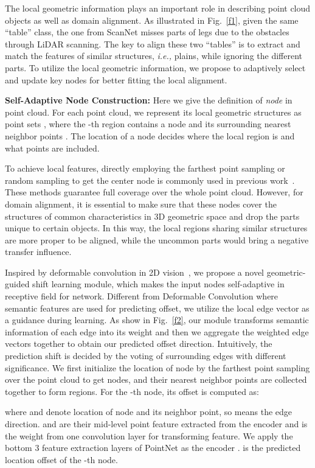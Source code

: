 \documentclass{article}
\begin{document}
The local geometric information plays an important role in describing point cloud objects as well as domain alignment. As illustrated in Fig.~\ref{f1}, given the same “table” class, the one from ScanNet misses parts of legs due to the obstacles through LiDAR scanning. The key to align these two “tables” is to extract and match the features of similar structures, \textit{i.e.,} plains, while ignoring the different parts. To utilize the local geometric information, we propose to adaptively select and update key nodes for better fitting the local alignment.

\textbf{Self-Adaptive Node Construction:} Here we give the definition of \textit{node} in point cloud. For each point cloud, we represent its  local geometric structures as  point sets , where the -th region  contains a node  and its surrounding  nearest neighbor points . The location of a node decides where the local region is and what points are included.

To achieve local features, directly employing the farthest point sampling or random sampling to get the center node is commonly used in previous work~\cite{qi2017pointnet++,li2018pointcnn}. These methods guarantee full coverage over the whole point cloud. However, for domain alignment, it is essential to make sure that these nodes cover the structures of common characteristics in 3D geometric space and drop the parts unique to certain objects. In this way, the local regions sharing similar structures are more proper to be aligned, while the uncommon parts would bring a negative transfer influence.

Inspired by deformable convolution in 2D vision~\cite{dai2017deformable}, we propose a novel geometric-guided shift learning module, which makes the input nodes self-adaptive in receptive field for network. Different from Deformable Convolution where semantic features are used for predicting offset, we utilize the local edge vector as a guidance during learning. As show in Fig.~\ref{f2}, our module transforms semantic information of each edge into its weight and then we aggregate the weighted edge vectors together to obtain our predicted offset direction. Intuitively, the prediction shift is decided by the voting of surrounding edges with different significance. We first initialize the location of node by the farthest point sampling over the point cloud to get  nodes, and their  nearest neighbor points are collected together to form  regions. For the -th node, its offset is computed as:

where  and  denote location of node and its neighbor point, so  means the edge direction.  and  are their mid-level point feature extracted from the encoder  and  is the weight from one convolution layer for transforming feature. We apply the bottom 3 feature extraction layers of PointNet as the encoder .  is the predicted location offset of the -th node.
\end{document}
